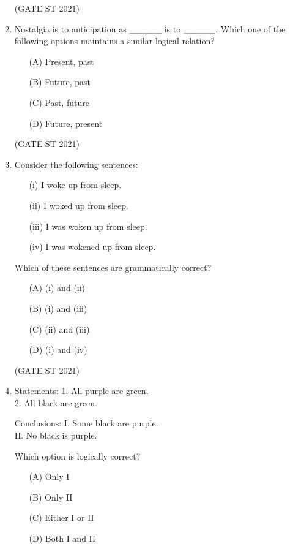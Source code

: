 \documentclass[journal,12pt,onecolumn]{IEEEtran}
\theoremstyle{remark}
\begin{document}
\begin{enumerate}
\hfill (GATE ST 2021) \\



\item
Nostalgia is to anticipation as \_\_\_\_\_ is to \_\_\_\_\_.  
Which one of the following options maintains a similar logical relation?

\begin{enumerate}
\item[(A)] Present, past
\item[(B)] Future, past
\item[(C)] Past, future
\item[(D)] Future, present
\end{enumerate}
\hfill (GATE ST 2021)

 

\item
Consider the following sentences:
\begin{enumerate}
\item[(i)] I woke up from sleep.
\item[(ii)] I woked up from sleep.
\item[(iii)] I was woken up from sleep.
\item[(iv)] I was wokened up from sleep.
\end{enumerate}
Which of these sentences are grammatically correct?
\begin{enumerate}
\item[(A)] (i) and (ii)
\item[(B)] (i) and (iii)
\item[(C)] (ii) and (iii)
\item[(D)] (i) and (iv)
\end{enumerate}
\hfill (GATE ST 2021)\\



\item
Statements:  
1. All purple are green. \\ 
2. All black are green.  

Conclusions: 
I. Some black are purple.  \\
II. No black is purple.

Which option is logically correct?
\begin{enumerate}
\item[(A)] Only I  
\item[(B)] Only II  
\item[(C)] Either I or II  
\item[(D)] Both I and II
\end{enumerate}


\end{enumerate}
\end{document}
